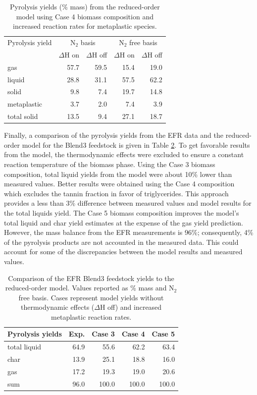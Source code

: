 \begin{table}[H]
    \centering
    \caption{Pyrolysis yields (\% mass) from the reduced-order model using Case 4 biomass composition and increased reaction rates for metaplastic species.}
    \label{tab:rom-yields2}
    \begin{tabular}{lrrrr}
        \toprule
        Pyrolysis yield & \multicolumn{2}{c}{N$_2$ basis} & \multicolumn{2}{c}{N$_2$ free basis} \\
        & $\Delta$H on & $\Delta$H off& $\Delta$H on & $\Delta$H off \\
        \midrule
        gas         & 57.7 & 59.5 & 15.4 & 19.0 \\
        liquid      & 28.8 & 31.1 & 57.5 & 62.2 \\
        solid       &  9.8 &  7.4 & 19.7 & 14.8 \\
        metaplastic &  3.7 &  2.0 &  7.4 &  3.9 \\
        total solid & 13.5 &  9.4 & 27.1 & 18.7 \\
        \bottomrule
    \end{tabular}
\end{table}

Finally, a comparison of the pyrolysis yields from the EFR data and the reduced-order model for the Blend3 feedstock is given in Table \ref{tab:blend3-yields}. To get favorable results from the model, the thermodynamic effects were excluded to ensure a constant reaction temperature of the biomass phase. Using the Case 3 biomass composition, total liquid yields from the model were about 10\% lower than measured values. Better results were obtained using the Case 4 composition which excludes the tannin fraction in favor of triglycerides. This approach provides a less than 3\% difference between measured values and model results for the total liquids yield. The Case 5 biomass composition improves the model's total liquid and char yield estimates at the expense of the gas yield prediction. However, the mass balance from the EFR measurements is 96\%; consequently, 4\% of the pyrolysis products are not accounted in the measured data. This could account for some of the discrepancies between the model results and measured values.

\begin{table}[H]
    \centering
    \caption{Comparison of the EFR Blend3 feedstock yields to the reduced-order model. Values reported as \% mass and N$_2$ free basis. Cases represent model yields without thermodynamic effects ($\Delta$H off) and increased metaplastic reaction rates.}
    \label{tab:blend3-yields}
    \begin{tabular}{lrrrr}
        \toprule
        Pyrolysis yields & Exp. & Case 3 & Case 4 & Case 5 \\
        \midrule
        total liquid & 64.9 & 55.6  & 62.2  & 63.4  \\
        char         & 13.9 & 25.1  & 18.8  & 16.0  \\
        gas          & 17.2 & 19.3  & 19.0  & 20.6  \\
        sum          & 96.0 & 100.0 & 100.0 & 100.0 \\
        \bottomrule
    \end{tabular}
\end{table}
